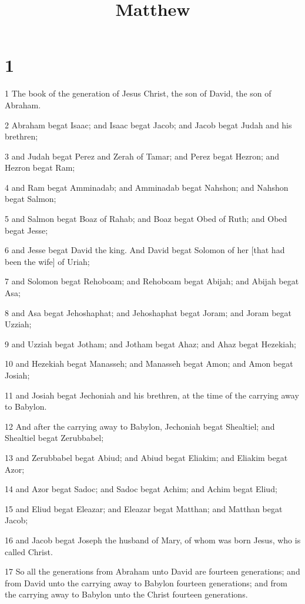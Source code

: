 

\title{Matthew}

\chapter{1}

\par 1 The book of the generation of Jesus Christ, the son of David, the son of Abraham.
\par 2 Abraham begat Isaac; and Isaac begat Jacob; and Jacob begat Judah and his brethren;
\par 3 and Judah begat Perez and Zerah of Tamar; and Perez begat Hezron; and Hezron begat Ram;
\par 4 and Ram begat Amminadab; and Amminadab begat Nahshon; and Nahshon begat Salmon;
\par 5 and Salmon begat Boaz of Rahab; and Boaz begat Obed of Ruth; and Obed begat Jesse;
\par 6 and Jesse begat David the king. And David begat Solomon of her [that had been the wife] of Uriah;
\par 7 and Solomon begat Rehoboam; and Rehoboam begat Abijah; and Abijah begat Asa;
\par 8 and Asa begat Jehoshaphat; and Jehoshaphat begat Joram; and Joram begat Uzziah;
\par 9 and Uzziah begat Jotham; and Jotham begat Ahaz; and Ahaz begat Hezekiah;
\par 10 and Hezekiah begat Manasseh; and Manasseh begat Amon; and Amon begat Josiah;
\par 11 and Josiah begat Jechoniah and his brethren, at the time of the carrying away to Babylon.
\par 12 And after the carrying away to Babylon, Jechoniah begat Shealtiel; and Shealtiel begat Zerubbabel;
\par 13 and Zerubbabel begat Abiud; and Abiud begat Eliakim; and Eliakim begat Azor;
\par 14 and Azor begat Sadoc; and Sadoc begat Achim; and Achim begat Eliud;
\par 15 and Eliud begat Eleazar; and Eleazar begat Matthan; and Matthan begat Jacob;
\par 16 and Jacob begat Joseph the husband of Mary, of whom was born Jesus, who is called Christ.
\par 17 So all the generations from Abraham unto David are fourteen generations; and from David unto the carrying away to Babylon fourteen generations; and from the carrying away to Babylon unto the Christ fourteen generations.
